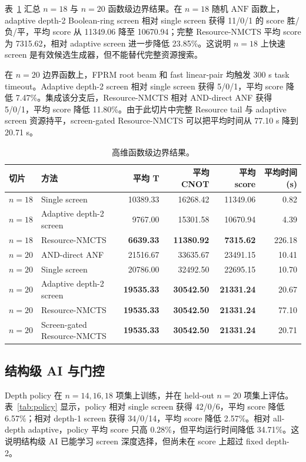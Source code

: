\documentclass[UTF8,fontset=macnew,11pt]{ctexart}
\newcommand{\method}{Resource-NMCTS}
\newcommand{\screen}{Boolean-ring screen}
\newcommand{\anf}{\ensuremath{\mathrm{ANF}}}
\begin{document}
表~\ref{tab:n18n20} 汇总 $n=18$ 与 $n=20$ 函数级边界结果。在 $n=18$ 随机 \anf{} 函数上，adaptive depth-2 \screen{} 相对 single screen 获得 11/0/1 的 score 胜/负/平，平均 score 从 11349.06 降至 10670.94；完整 \method{} 平均 score 为 7315.62，相对 adaptive screen 进一步降低 23.85\%。这说明 $n=18$ 上快速 screen 是有效候选生成器，但不能替代完整资源搜索。

在 $n=20$ 边界函数上，FPRM root beam 和 fast linear-pair 均触发 300 s task timeout。Adaptive depth-2 screen 相对 single screen 获得 5/0/1，平均 score 降低 7.47\%。集成该分支后，\method{} 相对 AND-direct ANF 获得 5/0/1，平均 score 降低 11.80\%。由于此切片中完整 Resource tail 与 adaptive screen 资源持平，screen-gated \method{} 可以把平均时间从 77.10 s 降到 20.71 s。

\begin{table}[t]
\centering
\scriptsize
\caption{高维函数级边界结果。}
\label{tab:n18n20}
\begin{tabular}{llrrrr}
\toprule
切片 & 方法 & 平均 T & 平均 CNOT & 平均 score & 平均时间(s) \\
\midrule
$n=18$ & Single screen & 10389.33 & 16268.42 & 11349.06 & 0.82 \\
$n=18$ & Adaptive depth-2 screen & 9767.00 & 15301.58 & 10670.94 & 4.39 \\
$n=18$ & \method{} & \textbf{6639.33} & \textbf{11380.92} & \textbf{7315.62} & 226.18 \\
$n=20$ & AND-direct ANF & 21516.67 & 33635.67 & 23491.15 & 10.41 \\
$n=20$ & Single screen & 20786.00 & 32492.50 & 22695.15 & 10.70 \\
$n=20$ & Adaptive depth-2 screen & \textbf{19535.33} & \textbf{30542.50} & \textbf{21331.24} & 20.67 \\
$n=20$ & \method{} & \textbf{19535.33} & \textbf{30542.50} & \textbf{21331.24} & 77.10 \\
$n=20$ & Screen-gated \method{} & \textbf{19535.33} & \textbf{30542.50} & \textbf{21331.24} & 20.71 \\
\bottomrule
\end{tabular}
\end{table}

\subsection{结构级 AI 与门控}

Depth policy 在 $n=14,16,18$ 项集上训练，并在 held-out $n=20$ 项集上评估。表~\ref{tab:policy} 显示，policy 相对 single screen 获得 42/0/6，平均 score 降低 6.57\%；相对 depth-1 screen 获得 34/0/14，平均 score 降低 2.57\%。相对 all-depth adaptive，policy 平均 score 只高 0.28\%，但平均运行时间降低 34.71\%。这说明结构级 AI 已能学习 screen 深度选择，但尚未在 score 上超过 fixed depth-2。
\end{document}
